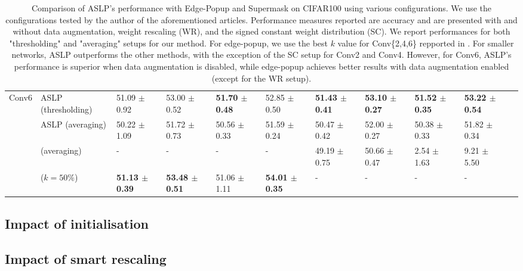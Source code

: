 \begin{table}
{\begin{tabular}{lllllllllll}
      \multirow{4}{*}{Conv6} & ASLP (thresholding) & 51.09 $\pm$ 0.92 & 53.00 $\pm$ 0.52 & \textbf{51.70 $\pm$ 0.48} & 52.85 $\pm$ 0.50 & \textbf{51.43 $\pm$ 0.41} & \textbf{53.10 $\pm$ 0.27} & \textbf{51.52 $\pm$ 0.35} & \textbf{53.22 $\pm$ 0.54} \\
      & ASLP (averaging) & 50.22 $\pm$ 1.09 & 51.72 $\pm$ 0.73 & 50.56 $\pm$ 0.33 & 51.59 $\pm$ 0.24 & 50.47 $\pm$ 0.42 & 52.00 $\pm$ 0.27 & 50.38 $\pm$ 0.33 & 51.82 $\pm$ 0.34 \\
      & \cite{DBLP:conf/nips/ZhouLLY19} (averaging) & - & - & - & - & 49.19 $\pm$ 0.75 & 50.66 $\pm$ 0.47 & 2.54 $\pm$ 1.63 & 9.21 $\pm$ 5.50 \\
      & \cite{DBLP:conf/cvpr/RamanujanWKFR20} ($k=50\%$) & \textbf{51.13 $\pm$ 0.39} & \textbf{53.48 $\pm$ 0.51} & 51.06 $\pm$ 1.11 & \textbf{54.01 $\pm$ 0.35} & - & - & - & - \\
      \bottomrule
    \end{tabular}
  } \caption{Comparison of ASLP's performance with Edge-Popup and Supermask
  \cite{DBLP:conf/cvpr/RamanujanWKFR20,DBLP:conf/nips/ZhouLLY19} on CIFAR100
  using various configurations. We use the configurations tested by the author
  of the aforementioned articles. Performance measures reported are accuracy and
  are presented with and without data augmentation, weight rescaling (WR), and
  the signed constant weight distribution (SC). We report performances for both
  "thresholding" and "averaging" setups for our method. For edge-popup, we use
  the best $k$ value for Conv\{2,4,6\} repported in
  \cite{DBLP:conf/cvpr/RamanujanWKFR20}. For smaller networks, ASLP outperforms
  the other methods, with the exception of the SC setup for Conv2 and Conv4.
  However, for Conv6, ASLP's performance is superior when data augmentation is
  disabled, while edge-popup achieves better results with data augmentation
  enabled (except for the WR setup).}
  \label{tab:chap2:con_performances_comparison_cifar100}
\end{table}

\subsection{Impact of initialisation}

\subsection{Impact of smart rescaling}



